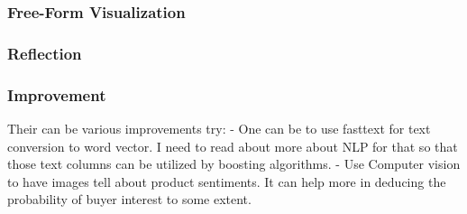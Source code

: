 \documentclass[11pt]{article}
\begin{document}
    \subsubsection{Free-Form Visualization}\label{free-form-visualization}

    \subsubsection{Reflection}\label{reflection}

    \subsubsection{Improvement}\label{improvement}

    Their can be various improvements try: - One can be to use fasttext for
text conversion to word vector. I need to read about more about NLP for
that so that those text columns can be utilized by boosting algorithms.
- Use Computer vision to have images tell about product sentiments. It
can help more in deducing the probability of buyer interest to some
extent.


    
    
    
    
\end{document}
